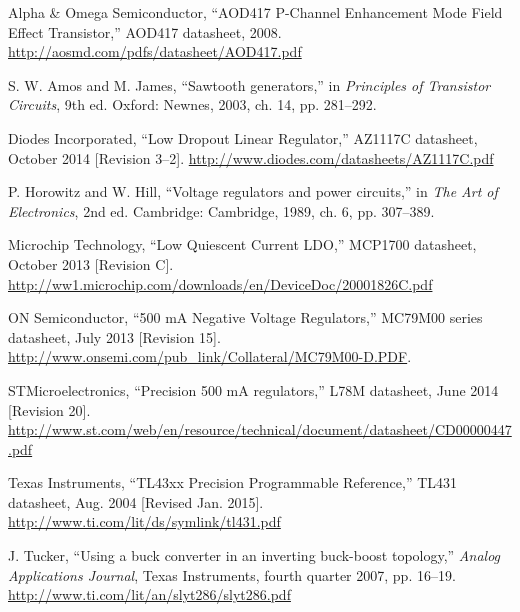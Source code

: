 \begin{thebibliography}{9}

Alpha \& Omega Semiconductor, ``AOD417 P-Channel Enhancement Mode Field Effect Transistor,''
AOD417 datasheet, 2008. \url{http://aosmd.com/pdfs/datasheet/AOD417.pdf}

S. W. Amos and M. James, ``Sawtooth generators,'' in
\emph{Principles of Transistor Circuits}, 9th ed. Oxford: Newnes, 2003, ch. 14, pp. 281--292.

Diodes Incorporated, ``Low Dropout Linear Regulator,'' AZ1117C datasheet,
October 2014 [Revision 3--2].
\url{http://www.diodes.com/datasheets/AZ1117C.pdf}

P. Horowitz and W. Hill, ``Voltage regulators and power circuits,'' in
\emph{The Art of Electronics}, 2nd ed. Cambridge: Cambridge, 1989, ch. 6, pp. 307--389.

Microchip Technology, ``Low Quiescent Current LDO,'' MCP1700 datasheet,
October 2013 [Revision C].
\url{http://ww1.microchip.com/downloads/en/DeviceDoc/20001826C.pdf}

ON Semiconductor, ``500 mA Negative Voltage Regulators,'' MC79M00 series datasheet,
July 2013 [Revision 15].
\url{http://www.onsemi.com/pub_link/Collateral/MC79M00-D.PDF}.

STMicroelectronics, ``Precision 500 mA regulators,'' L78M datasheet, June 2014 [Revision 20].
\url{http://www.st.com/web/en/resource/technical/document/datasheet/CD00000447.pdf}

Texas Instruments, ``TL43xx Precision Programmable Reference,''
TL431 datasheet, Aug. 2004 [Revised Jan. 2015]. \url{http://www.ti.com/lit/ds/symlink/tl431.pdf}

J. Tucker, ``Using a buck converter in an inverting buck-boost topology,''
\emph{Analog Applications Journal}, Texas Instruments, fourth quarter 2007, pp. 16--19.
\url{http://www.ti.com/lit/an/slyt286/slyt286.pdf}
\end{thebibliography}
